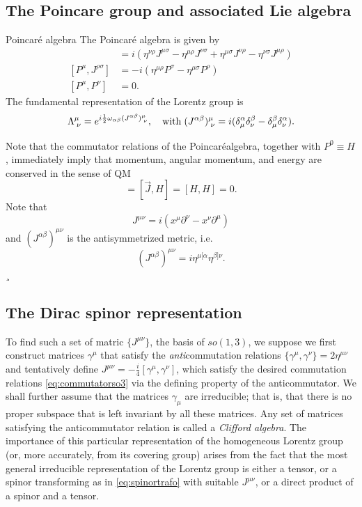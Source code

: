   \subsection{The Poincare group and associated Lie algebra}
  \begin{mybox}{Poincaré algebra}
  	The Poincaré algebra is given by
  	\begin{align}
  		[J^{\mu \nu} , J^{\rho \sigma}] &= i \left( \eta^{\nu \rho} J^{\mu \sigma} - \eta^{\mu\rho} J^{\nu\sigma} +\eta^{\mu \sigma} J^{\nu\rho} -\eta^{\nu\sigma} J^{\mu\rho} \right)\\
  		[P^\mu,J^{ \rho \sigma}]&= -i \left(\eta^{\mu \rho} P^\sigma - \eta^{\mu \sigma} P^\rho\right)\\
  		[P^\mu,P^\nu]&=0.
  	\end{align}
  The fundamental representation of the Lorentz group is
  \begin{equation}
  	\Lambda^\mu_{\;\nu} =e^{i \frac{1}{2} \omega_{\alpha \beta} (J^{\alpha \beta})^\mu_{\;\nu}}, \quad \mathrm{with}\; (J^{\alpha \beta})^\mu_{\;\nu} = i (\delta^\alpha_\mu \delta^\beta_\nu -\delta^\beta_\mu \delta^\alpha_\nu ).
  \end{equation}
  \end{mybox}
  Note that the commutator relations of the Poincaréalgebra, together with $P^0 ≡ H$, immediately
  imply that momentum, angular momentum, and energy are conserved in the sense of QM
  \begin{equation}
  	[\vec{P},H]=[\vec{J},H] = [H,H] =0.
  \end{equation}
  Note that 
  \begin{equation}
  	J^{\mu\nu}= i(x^\mu \partial^\nu - x^\nu \partial^\mu )
  \end{equation}
  and $(J^{\alpha \beta} )^{\mu\nu}$ is the antisymmetrized metric, i.e.
  \begin{equation}
  (J^{\alpha \beta})^{\mu \nu} = i \eta^{\mu [\alpha}\eta^{\beta]\nu}.
  \end{equation}
¸\subsection{The Dirac spinor representation}
To find such a set of matric $\{J^{\mu\nu}\}$, the basis of $so(1,3)$, we suppose we first construct matrices $\gamma^\mu$ that satisfy the \emph{anti}commutation relations $\{\gamma^\mu, \gamma^\nu \} = 2 \eta^{\mu \nu}$ and tentatively define $J^{\mu \nu} = - \frac{i}{4} [\gamma^\mu,\gamma^\nu]$, which satisfy the desired commutation relations \ref{eq:commutatorso3} via the defining property of the anticommutator. We shall further assume that the matrices $\gamma_\mu$ are irreducible; that is, that there is no proper subspace that is left invariant by all these matrices. Any set of matrices satisfying the anticommutator relation is called a \emph{Clifford algebra}. The importance of this particular representation of the homogeneous Lorentz group (or, more accurately, from its covering group) arises from the fact that the most general irreducible representation of the Lorentz group is either a tensor, or a spinor transforming as in \ref{eq:spinortrafo} with suitable $J^{\mu\nu}$, or a direct product of a spinor and a tensor.




